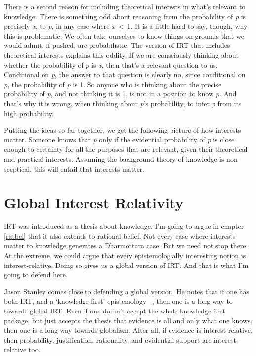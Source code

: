 \documentclass[
  11pt,
]{book}
\begin{document}
There is a second reason for including theoretical interests in what's relevant to knowledge. There is something odd about reasoning from the probability of \emph{p} is precisely \emph{x}, to \emph{p}, in any case where \emph{x}~\textless~1. It is a little hard to say, though, why this is problematic. We often take ourselves to know things on grounds that we would admit, if pushed, are probabilistic. The version of IRT that includes theoretical interests explains this oddity. If we are consciously thinking about whether the probability of \emph{p} is \emph{x}, then that's a relevant question to us. Conditional on \emph{p}, the answer to that question is clearly no, since conditional on \emph{p}, the probability of \emph{p} is 1. So anyone who is thinking about the precise probability of \emph{p}, and not thinking it is 1, is not in a position to know \emph{p}. And that's why it is wrong, when thinking about \emph{p}'s probability, to infer \emph{p} from its high probability.

Putting the ideas so far together, we get the following picture of how interests matter. Someone knows that \emph{p} only if the evidential probability of \emph{p} is close enough to certainty for all the purposes that are relevant, given their theoretical and practical interests. Assuming the background theory of knowledge is non-sceptical, this will entail that interests matter.

\hypertarget{global}{%
\section{Global Interest Relativity}\label{global}}

IRT was introduced as a thesis about knowledge. I'm going to argue in chapter \ref{ratbel} that it also extends to rational belief. Not every case where interests matter to knowledge generates a Dharmottara case. But we need not stop there. At the extreme, we could argue that every epistemologially interesting notion is interest-relative. Doing so gives us a global version of IRT. And that is what I'm going to defend here.

Jason Stanley \citeyearpar{Stanley2005} comes close to defending a global version. He notes that if one has both IRT, and a `knowledge first' epistemology ~\citep{Williamson2000}, then one is a long way to towards global IRT. Even if one doesn't accept the whole knowledge first package, but just accepts the thesis that evidence is all and only what one knows, then one is a long way towards globalism. After all, if evidence is interest-relative, then probability, justification, rationality, and evidential support are interest-relative too.
\end{document}
